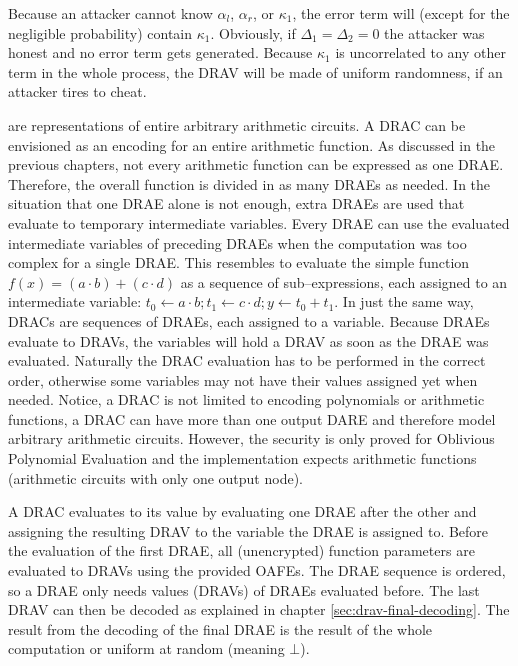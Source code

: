 \noindent{}Because an attacker cannot know $\alpha_l$, $\alpha_r$, or
$\kappa_1$, the error term will (except for the negligible probability) contain
$\kappa_1$. Obviously, if $\Delta_1 = \Delta_2 = 0$ the attacker was honest and
no error term gets generated. Because $\kappa_1$ is uncorrelated to any other
term in the whole process, the DRAV will be made of uniform randomness, if an
attacker tires to cheat.


%
%
\label{sec:drac}

 are representations of entire
arbitrary arithmetic circuits. A DRAC can be envisioned as an encoding for an
entire arithmetic function. As discussed in the previous chapters, not every
arithmetic function can be expressed as one DRAE\@. Therefore, the overall
function is divided in as many DRAEs as needed. In the situation that one DRAE
alone is not enough, extra DRAEs are used that evaluate to temporary
intermediate variables. Every DRAE can use the evaluated intermediate variables
of preceding DRAEs when the computation was too complex for a single DRAE\@.
This resembles to evaluate the simple function $f(x) = (a \cdot b) + (c \cdot
d)$ as a sequence of sub--expressions, each assigned to an intermediate
variable: $t_0 \leftarrow a \cdot b; t_1 \leftarrow c \cdot d; y \leftarrow t_0
+ t_1$.  In just the same way, DRACs are sequences of DRAEs, each assigned to a
variable.  Because DRAEs evaluate to DRAVs, the variables will hold a DRAV as
soon as the DRAE was evaluated. Naturally the DRAC evaluation has to be
performed in the correct order, otherwise some variables may not have their
values assigned yet when needed. Notice, a DRAC is not limited to encoding
polynomials or arithmetic functions, a DRAC can have more than one output DARE
and therefore model arbitrary arithmetic circuits. However, the security is
only proved for Oblivious Polynomial Evaluation and the implementation expects
arithmetic functions (arithmetic circuits with only one output node).


\label{sec:DRAC-eval}

A DRAC evaluates to its value by evaluating one DRAE after the other and
assigning the resulting DRAV to the variable the DRAE is assigned to. Before the
evaluation of the first DRAE, all (unencrypted) function parameters are
evaluated to DRAVs using the provided OAFEs. The DRAE sequence is ordered, so a
DRAE only needs values (DRAVs) of DRAEs evaluated before. The last DRAV can then
be decoded as explained in chapter \ref{sec:drav-final-decoding}. The result
from the decoding of the final DRAE is the result of the whole computation or
uniform at random (meaning $\bot$).


